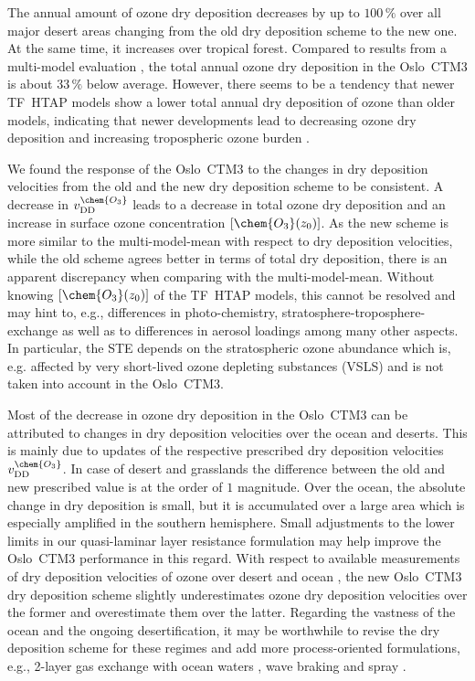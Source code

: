 \documentclass[gmd, manuscript]{copernicus}
\begin{document}
The annual amount of ozone dry deposition decreases by up to $100\,\unit{\%}$ over all major desert areas changing from the old dry deposition scheme to the new one. At the same time, it increases over tropical forest. Compared to results from a multi-model evaluation \citep{ACP:Hardacre2015}, the total annual ozone dry deposition in the Oslo~CTM3 is about $33\,\unit{\%}$ below average. However, there seems to be a tendency that newer TF~HTAP models show a lower total annual dry deposition of ozone than older models, indicating that newer developments lead to decreasing ozone dry deposition and increasing tropospheric ozone burden \citep[e.g.,][]{ACP:Luhar2017,ACP:Luhar2018,AE:Hu2017}.

We found the response of the Oslo~CTM3 to the changes in dry deposition velocities from the old and the new dry deposition scheme to be consistent. A decrease in $v_\text{DD}^\chem{O_3}$ leads to a decrease in total ozone dry deposition and an increase in surface ozone concentration $[\chem{O_3}(z_0)]$. As the new scheme is more similar to the multi-model-mean \citep{ACP:Hardacre2015} with respect to dry deposition velocities, while the old scheme agrees better in terms of total dry deposition, there is an apparent discrepancy when comparing with the multi-model-mean. Without knowing $[\chem{O_3}(z_0)]$ of the TF~HTAP models, this cannot be resolved and may hint to, e.g., differences in photo-chemistry, stratosphere-troposphere-exchange as well as to differences in aerosol loadings among many other aspects. In particular, the STE depends on the stratospheric ozone abundance which is, e.g. affected by very short-lived ozone depleting substances (VSLS) \citep{JGR:Warwick2006, ACP:Ziska2013, ACP:Hossaini2016, ACP:Falk2017} and is not taken into account in the Oslo~CTM3.

Most of the decrease in ozone dry deposition in the Oslo~CTM3 can be attributed to changes in dry deposition velocities over the ocean and deserts. This is mainly due to updates of the respective prescribed dry deposition velocities $v_\text{DD}^\chem{O_3}$. In case of desert and grasslands the difference between the old and new prescribed value is at the order of $1$ magnitude. Over the ocean, the absolute change in dry deposition is small, but it is accumulated over a large area which is especially amplified in the southern hemisphere. Small adjustments to the lower limits in our quasi-laminar layer resistance formulation may help improve the Oslo~CTM3 performance in this regard. With respect to available measurements of dry deposition velocities of ozone over desert \citep{AE:Gusten1995} and ocean \citep{JGR:Helmig2012}, the new Oslo~CTM3 dry deposition scheme slightly underestimates ozone dry deposition velocities over the former and overestimate them over the latter. Regarding the vastness of the ocean and the ongoing desertification, it may be worthwhile to revise the dry deposition scheme for these regimes and add more process-oriented formulations, e.g., 2-layer gas exchange with ocean waters \citep{ACP:Luhar2017, ACP:Luhar2018}, wave braking and spray \citep{ACP:Pozzer2006}.
\end{document}
